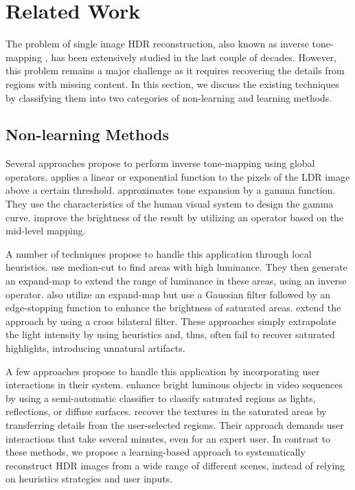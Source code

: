 \section{Related Work}

The problem of single image HDR reconstruction, also known as inverse tone-mapping \cite{banterle2006inverse}, has been extensively studied in the last couple of decades. However, this problem remains a major challenge as it requires recovering the details from regions with missing content. In this section, we discuss the existing techniques by classifying them into two categories of non-learning and learning methods.

\subsection{Non-learning Methods}

Several approaches propose to perform inverse tone-mapping using global operators. \citet{landis2002production} applies a linear or exponential function to the pixels of the LDR image above a certain threshold. \citet{bist2017tone} approximates tone expansion by a gamma function. They use the characteristics of the human visual system to design the gamma curve. \citet{luzardo2018fully} improve the brightness of the result by utilizing an operator based on the mid-level mapping.

A number of techniques propose to handle this application through local heuristics. \citet{banterle2006inverse} use median-cut \cite{debevec2005median} to find areas with high luminance. They then generate an expand-map to extend the range of luminance in these areas, using an inverse operator. \citet{rempel2007ldr2hdr} also utilize an expand-map but use a Gaussian filter followed by an edge-stopping function to enhance the brightness of saturated areas. \citet{kovaleski2014high} extend the approach by \citet{rempel2007ldr2hdr} using a cross bilateral filter. These approaches simply extrapolate the light intensity by using heuristics and, thus, often fail to recover saturated highlights, introducing unnatural artifacts.

A few approaches propose to handle this application by incorporating user interactions in their system. \citet{didyk2008enhancement} enhance bright luminous objects in video sequences by using a semi-automatic classifier to classify saturated regions as lights, reflections, or diffuse surfaces. \citet{wang2007high} recover the textures in the saturated areas by transferring details from the user-selected regions. Their approach demands user interactions that take several minutes, even for an expert user. In contrast to these methods, we propose a learning-based approach to systematically reconstruct HDR images from a wide range of different scenes, instead of relying on heuristics strategies and user inputs.

